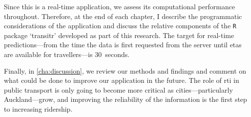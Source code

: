Since this is a real-time application, we assess its computational performance throughout. Therefore, at the end of each chapter, I describe the programmatic considerations of the application and discuss the relative components of the \verb+R+ package `transitr' developed as part of this research. The target for real-time predictions---from the time the data is first requested from the server until \glspl{eta} are available for travellers---is 30~seconds.


Finally, in \cref{cha:discussion}, we review our methods and findings and comment on what could be done to improve our application in the future. The role of \gls{rti} in public transport is only going to become more critical as cities---particularly Auckland---grow, and improving the reliability of the information is the first step to increasing ridership.
